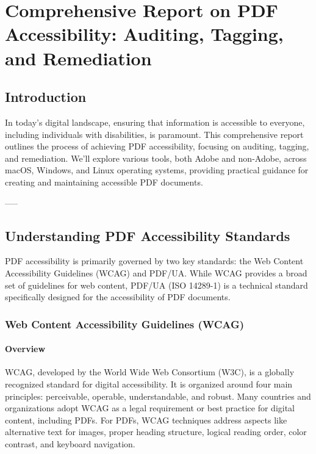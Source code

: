\chapter{Comprehensive Report on PDF Accessibility: Auditing, Tagging, and Remediation}
\label{chap:pdf-accessibility}

\section{Introduction}
\label{sec:introduction}
In today's digital landscape, ensuring that information is accessible to everyone, including individuals with disabilities, is paramount. This comprehensive report outlines the process of achieving PDF accessibility, focusing on auditing, tagging, and remediation. We'll explore various tools, both Adobe and non-Adobe, across macOS, Windows, and Linux operating systems, providing practical guidance for creating and maintaining accessible PDF documents.

-----

\section{Understanding PDF Accessibility Standards}
\label{sec:pdf-accessibility-standards}
PDF accessibility is primarily governed by two key standards: the Web Content Accessibility Guidelines (WCAG) and PDF/UA. While WCAG provides a broad set of guidelines for web content, PDF/UA (ISO 14289-1) is a technical standard specifically designed for the accessibility of PDF documents.

\subsection{Web Content Accessibility Guidelines (WCAG)}
\label{subsec:wcag}

\subsubsection{Overview}

WCAG, developed by the World Wide Web Consortium (W3C), is a globally recognized standard for digital accessibility. It is organized around four main principles: perceivable, operable, understandable, and robust. Many countries and organizations adopt WCAG as a legal requirement or best practice for digital content, including PDFs. \cite{WCAG22} For PDFs, WCAG techniques address aspects like alternative text for images, proper heading structure, logical reading order, color contrast, and keyboard navigation. \cite{WCAG22Tech}

